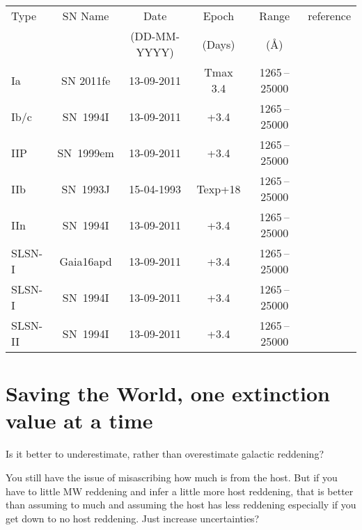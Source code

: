 \documentclass[twocolumn]{aastex61}
\begin{document}
\begin{figure*}
\caption{The central value of A$_V$ is plotted with respect to the mean of the A$_V$ values 20\arcmin away in each of the four cardinal directions.  102 random positions are plotted in grey.  The sample from \citet{Rice_etal_1998} which should have already been removed are blue triangles.  Nearby galaxies used to calibrate the Cepheid-SN distance ladder \citep{Riess_etal_2016} are plotted as red triangles.  The sample of Swift supernovae that I care about are green triangles.  A 1:1 line shows perfect agreement between the values.
\label{fig_av}}
\end{figure*}


\begin{table*}
\caption{Problematic Galaxies}
\label{table_templates}
\begin{tabular}{lccccc}
\hline
\hline
Type    & SN Name & Date & Epoch & Range & reference \\
        &         & (DD-MM-YYYY) & (Days) & (\AA) &  \\
\hline
Ia      & SN 2011fe & 13-09-2011 & Tmax 3.4 & 1265 – 25000 &   \\
Ib/c    & SN~1994I  & 13-09-2011 & +3.4 & 1265 – 25000 &  \\
IIP     & SN~1999em  & 13-09-2011 & +3.4 & 1265 – 25000 &   \\
IIb     & SN~1993J  & 15-04-1993 & Texp+18 & 1265 – 25000 &   \\
IIn     & SN~1994I  & 13-09-2011 & +3.4 & 1265 – 25000 &   \\
SLSN-I  & Gaia16apd  & 13-09-2011 & +3.4 & 1265 – 25000 &   \\
SLSN-I  & SN~1994I  & 13-09-2011 & +3.4 & 1265 – 25000 &   \\
SLSN-II & SN~1994I  & 13-09-2011 & +3.4 & 1265 – 25000 &   \\



\hline
\hline
\end{tabular}
\end{table*}

\section{Saving the World, one extinction value at a time  \label{sec_templates}}

Is it better to underestimate, rather than overestimate galactic reddening?

You still have the issue of misascribing how much is from the host.  But if you have to little MW reddening and infer a little more host reddening, that is better than assuming to much and assuming the host has less reddening especially if you get down to no host reddening.  Just increase uncertainties?
\end{document}

